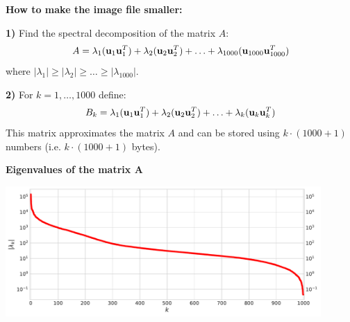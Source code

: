 {


\vskip  20mm

{\bf How to make the image file smaller:}

\vskip 5mm

{\bf 1)} Find the spectral decomposition of the matrix $A$:
$$A = \lambda_{1}({\bf u}_{1}{\bf u}_{1}^{T}) + \lambda_{2}({\bf u}_{2}{\bf u}_{2}^{T}) + {\dots} + \lambda_{1000}({\bf u}_{1000}{\bf u}_{1000}^{T})$$ 
where $|\lambda_{1}| \geq |\lambda_{2}| \geq {\dots} \geq |\lambda_{1000}|$.

\vskip 20mm

{\bf 2)} For $k = 1, \dots, 1000$ define:
$$B_{k} = \lambda_{1}({\bf u}_{1}{\bf u}_{1}^{T}) + \lambda_{2}({\bf u}_{2}{\bf u}_{2}^{T}) + {\dots} + \lambda_{k}({\bf u}_{k}{\bf u}_{k}^{T})$$ 
This matrix approximates the matrix $A$ and can be stored using $k\cdot(1000 + 1)$ numbers 
(i.e. $k\cdot(1000 + 1)$ bytes).  


\newpage

\begin{center}
{\bf Eigenvalues of the matrix $\mathbf A$}
\vskip 5mm

\includegraphics[width=0.9\textwidth]{einstein_eigenvalues.pdf}
\end{center}

\vskip 20mm

}
